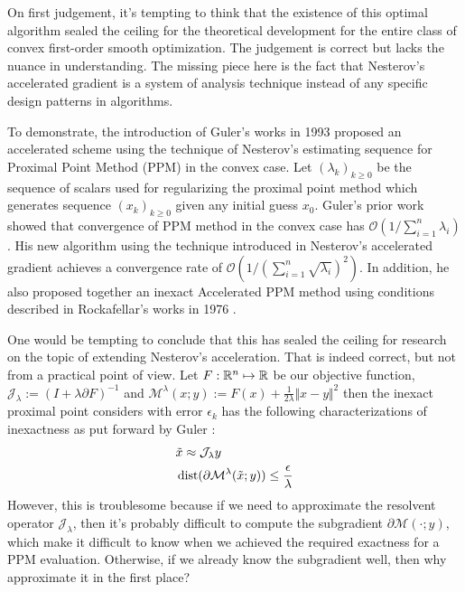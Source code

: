 \documentclass[12pt]{article}
\begin{document}
    On first judgement, it's tempting to think that the existence of this optimal algorithm sealed the ceiling for the theoretical development for the entire class of convex first-order smooth optimization. 
    The judgement is correct but lacks the nuance in understanding. 
    The missing piece here is the fact that Nesterov's accelerated gradient is a system of analysis technique instead of any specific design patterns in algorithms. 
    
    To demonstrate, the introduction of Guler's works in 1993 \cite{guler_new_1992} proposed an accelerated scheme using the technique of Nesterov's estimating sequence for Proximal Point Method (PPM) in the convex case. 
    Let $(\lambda_k)_{k \ge 0}$ be the sequence of scalars used for regularizing the proximal point method which generates sequence $(x_k)_{k\ge 0}$ given any initial guess $x_0$. 
    Guler's prior work \cite{guler_convergence_1991} showed that convergence of PPM method in the convex case has $\mathcal O\left(1/\sum^{n}_{i = 1}\lambda_i\right)$. 
    His new algorithm using the technique introduced in Nesterov's accelerated gradient achieves a convergence rate of $\mathcal O\left(1/(\sum_{i = 1}^{n} \sqrt{\lambda_i})^2\right)$. 
    In addition, he also proposed together an inexact Accelerated PPM method using conditions described in Rockafellar's works in 1976 \cite{rockafellar_monotone_1976}. 

    One would be tempting to conclude that this has sealed the ceiling for research on the topic of extending Nesterov's acceleration. 
    That is indeed correct, but not from a practical point of view. 
    Let $F: \mathbb R^n \mapsto \mathbb R$ be our objective function, $\mathcal J_\lambda := (I + \lambda \partial F)^{-1}$ and $\mathcal M^{\lambda}(x; y):= F(x) + \frac{1}{2\lambda}\Vert x - y\Vert^2$ then the inexact proximal point considers with error $\epsilon_k$ has the following characterizations of inexactness as put forward by Guler \cite{guler_new_1992}: 
    \begin{align*}
        & \tilde x \approx \mathcal J_\lambda y
        \\
        & 
        \operatorname{dist}(\partial\mathcal{M}^{\lambda}(\tilde x; y))
        \le \frac{\epsilon}{\lambda}
    \end{align*}
    However, this is troublesome because if we need to approximate the resolvent operator $\mathcal J_\lambda$, then it's probably difficult to compute the subgradient $\partial\mathcal M(\cdot; y)$, which make it difficult to know when we achieved the required exactness for a PPM evaluation. 
    Otherwise, if we already know the subgradient well, then why approximate it in the first place? 
\end{document}
